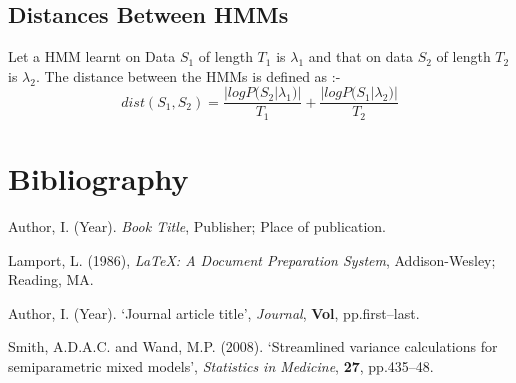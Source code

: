 \documentclass[a4paper, 10pt, notitlepage]{report}
\begin{document}
\section{Distances Between HMMs}
Let a HMM learnt on Data $S_1$ of length $T_1$ is $\lambda _1$ and that on data $S_2$ of length $T_2$ is $\lambda _ 2$. The distance between the HMMs is defined as :- \\

$$dist(S_1, S_2) = \frac{|logP(S_2|\lambda _ 1)|}{T_1} +\frac{|logP(S_1|\lambda _ 2)|}{T_2} $$
  

\chapter*{Bibliography}
%
\begin{description}

\item Author, I. (Year). \emph{Book Title}, Publisher; Place of publication.

\item Lamport, L. (1986), \emph{\LaTeX: A Document Preparation System}, Addison-Wesley; Reading, MA.

\item Author, I. (Year). `Journal article title', \emph{Journal}, \textbf{Vol}, pp.first--last.

\item Smith, A.D.A.C. and Wand, M.P. (2008). `Streamlined variance calculations for semiparametric
mixed models', \emph{Statistics in Medicine}, \textbf{27}, pp.435--48.

\end{description}
\end{document}
